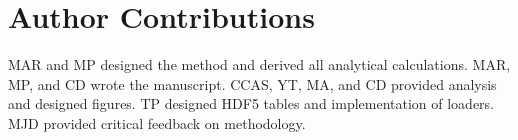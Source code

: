 % 
% 
% 
% 

\section*{Author Contributions}
MAR and MP designed the method and derived all analytical calculations. MAR, MP, and CD wrote the manuscript. CCAS, YT, MA, and CD provided analysis and designed figures. TP designed HDF5 tables and implementation of loaders. MJD provided critical feedback on methodology.

